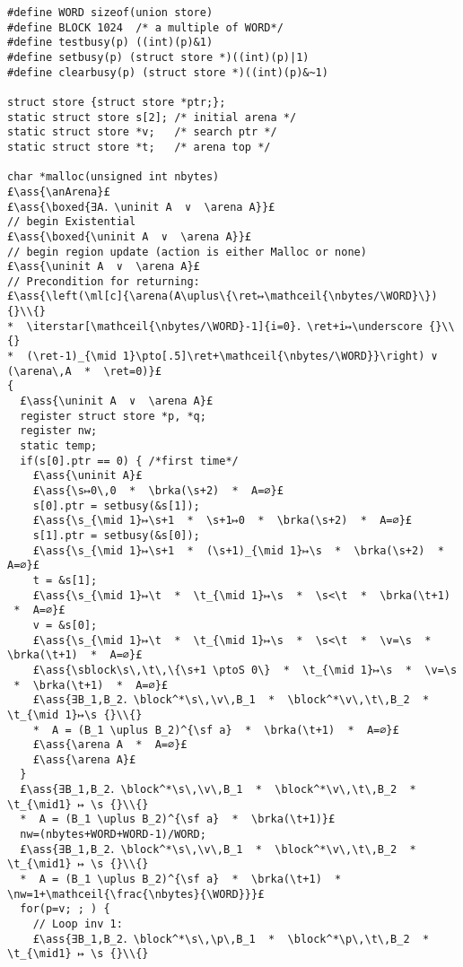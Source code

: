 \documentclass[12pt,a4paper]{article}
\makeatletter
\newcommand{\ml}[2][t]{\mbox{\mdseries\begin{tabular}[#1]{@{}L@{}}#2\end{tabular}}}
\newcommand{\ass}[1]{\ensuremath{{\color{blue}\left\{\ml[c]{#1}\right\}}}}
\newcommand{\iterstar}[2][]{\text{\LARGE $*$}^{#1}_{#2}}
\newcommand{\ret}{\texttt{ret}}
\newcommand{\arena}{\mathop{\emph{arena}}}
\newcommand{\anArena}{\emph{anArena}}
\newcommand{\block}{\mathop{\emph{block}}}
\newcommand{\sblock}{\mathop{\emph{sblock}}}
\newcommand{\s}{{\tt s}}
\renewcommand{\t}{{\tt t}}
\newcommand{\p}{{\tt p}}
\renewcommand{\v}{{\tt v}}
\newcommand{\brka}{\mathop{\emph{brka}}}
\newcommand{\nw}{{\tt nw}}
\newcommand{\nbytes}{{\tt nbytes}}
\newcommand{\WORD}{{\tt WORD}}
\newcommand{\mathceil}[1]{\left\lceil#1\right\rceil}
\newcommand{\ptoS}{\mathbin{↦_{\sf s}}}
\newcommand{\uninit}{\mathop{\emph{uninit}}}
\makeatother
\begin{document}
\begin{lstlisting}
#define WORD sizeof(union store)
#define BLOCK 1024	/* a multiple of WORD*/
#define testbusy(p) ((int)(p)&1)
#define setbusy(p) (struct store *)((int)(p)|1)
#define clearbusy(p) (struct store *)((int)(p)&~1)

struct store {struct store *ptr;};
static struct store s[2]; /* initial arena */
static struct store *v;   /* search ptr */
static struct store *t;   /* arena top */

char *malloc(unsigned int nbytes) 
£\ass{\anArena}£
£\ass{\boxed{∃A．\uninit A  ∨  \arena A}}£
// begin Existential
£\ass{\boxed{\uninit A  ∨  \arena A}}£
// begin region update (action is either Malloc or none)
£\ass{\uninit A  ∨  \arena A}£
// Precondition for returning:
£\ass{\left(\ml[c]{\arena(A\uplus\{\ret↦\mathceil{\nbytes/\WORD}\}) {}\\{}
*  \iterstar[\mathceil{\nbytes/\WORD}-1]{i=0}．\ret+i↦\underscore {}\\{}
*  (\ret-1)_{\mid 1}\pto[.5]\ret+\mathceil{\nbytes/\WORD}}\right) ∨ (\arena\,A  *  \ret=0)}£
{
  £\ass{\uninit A  ∨  \arena A}£
  register struct store *p, *q;
  register nw;
  static temp;
  if(s[0].ptr == 0) { /*first time*/
    £\ass{\uninit A}£
    £\ass{\s↦0\,0  *  \brka(\s+2)  *  A=∅}£
    s[0].ptr = setbusy(&s[1]);
    £\ass{\s_{\mid 1}↦\s+1  *  \s+1↦0  *  \brka(\s+2)  *  A=∅}£
    s[1].ptr = setbusy(&s[0]);
    £\ass{\s_{\mid 1}↦\s+1  *  (\s+1)_{\mid 1}↦\s  *  \brka(\s+2)  *  A=∅}£
    t = &s[1];
    £\ass{\s_{\mid 1}↦\t  *  \t_{\mid 1}↦\s  *  \s<\t  *  \brka(\t+1)  *  A=∅}£
    v = &s[0];
    £\ass{\s_{\mid 1}↦\t  *  \t_{\mid 1}↦\s  *  \s<\t  *  \v=\s  *  \brka(\t+1)  *  A=∅}£
    £\ass{\sblock\s\,\t\,\{\s+1 \ptoS 0\}  *  \t_{\mid 1}↦\s  *  \v=\s  *  \brka(\t+1)  *  A=∅}£
    £\ass{∃B_1,B_2．\block^*\s\,\v\,B_1  *  \block^*\v\,\t\,B_2  *  \t_{\mid 1}↦\s {}\\{}
    *  A = (B_1 \uplus B_2)^{\sf a}  *  \brka(\t+1)  *  A=∅}£
    £\ass{\arena A  *  A=∅}£
    £\ass{\arena A}£
  }
  £\ass{∃B_1,B_2．\block^*\s\,\v\,B_1  *  \block^*\v\,\t\,B_2  *  \t_{\mid1} ↦ \s {}\\{} 
  *  A = (B_1 \uplus B_2)^{\sf a}  *  \brka(\t+1)}£
  nw=(nbytes+WORD+WORD-1)/WORD;
  £\ass{∃B_1,B_2．\block^*\s\,\v\,B_1  *  \block^*\v\,\t\,B_2  *  \t_{\mid1} ↦ \s {}\\{} 
  *  A = (B_1 \uplus B_2)^{\sf a}  *  \brka(\t+1)  *  \nw=1+\mathceil{\frac{\nbytes}{\WORD}}}£
  for(p=v; ; ) { 
    // Loop inv 1:
    £\ass{∃B_1,B_2．\block^*\s\,\p\,B_1  *  \block^*\p\,\t\,B_2  *  \t_{\mid1} ↦ \s {}\\{}

\end{lstlisting}
\end{document}
